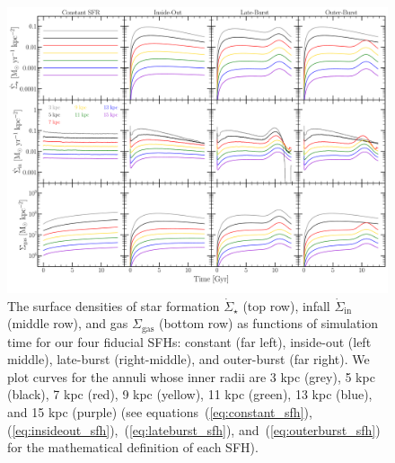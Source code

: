 \documentclass[a4paper, fleqn, usenatbib, useAMS]{mnras}
\newcommand{\refp}[1]{(\ref{#1})}
\begin{document}
\begin{figure} 
\centering 
\includegraphics[scale = 0.32]{sfh.pdf} 
\caption{The surface densities of star formation $\dot{\Sigma}_\star$ (top 
row), infall $\dot{\Sigma}_\text{in}$ (middle row), and gas $\Sigma_\text{gas}$ 
(bottom row) as functions of simulation time for our four fiducial SFHs: 
constant (far left), inside-out (left middle), late-burst (right-middle), 
and outer-burst (far right). We plot curves for the annuli whose inner radii 
are 3 kpc (grey), 5 kpc (black), 7 kpc (red), 9 kpc (yellow), 11 kpc (green), 
13 kpc (blue), and 15 kpc (purple) (see equations~\refp{eq:constant_sfh}, 
\refp{eq:insideout_sfh},~\refp{eq:lateburst_sfh}, and~\refp{eq:outerburst_sfh} 
for the mathematical definition of each SFH). } 
\label{fig:evol} 
\end{figure} 
\end{document}
